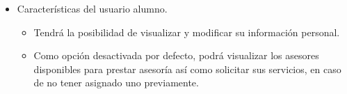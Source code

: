 \begin{itemize}
   \item Características del usuario alumno.
      \begin{itemize}
         \item Tendrá la posibilidad de visualizar y modificar su información
         personal.
         \item Como opción desactivada por defecto, podrá visualizar los
         asesores disponibles para prestar asesoría así como solicitar sus
         servicios, en caso de no tener asignado uno previamente.
      \end{itemize}
\end{itemize}

